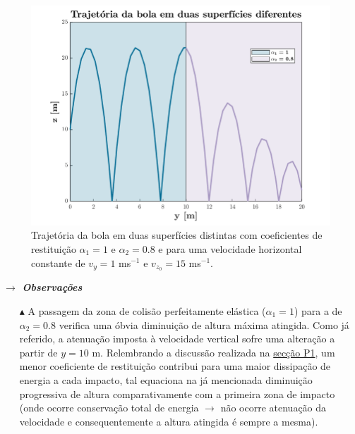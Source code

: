 \begin{figure}[H]
    \centering
    \includegraphics[width = 0.75\linewidth]{img/P3/P3-coefdif.png}
    \caption{Trajetória da bola em duas superfícies distintas com coeficientes de restituição $\alpha_1 = 1$ e $\alpha_2 = 0.8$ e para uma velocidade horizontal constante de $v_y = 1$ ms$^{-1}$ e $v_{z_0} = 15$ ms$^{-1}$.}
    \label{fig:2Pav}
\end{figure}

\noindent\textbf{\textit{$\rightarrow$ Observações}}
\vspace{-0.5em}
\begin{itemize}
    \item[$\blacktriangle$] A passagem da zona de colisão perfeitamente elástica ($\alpha_1 = 1$) para a de $\alpha_2 = 0.8$ verifica uma óbvia diminuição de altura máxima atingida. Como já referido, a atenuação imposta à velocidade vertical sofre uma alteração a partir de $y = 10$ m. Relembrando a discussão realizada na \hyperref[subsec:P1]{secção P1}, um menor coeficiente de restituição contribui para uma maior dissipação de energia a cada impacto, tal equaciona na já mencionada diminuição progressiva de altura comparativamente com a primeira zona de impacto (onde ocorre conservação total de energia $\rightarrow$ não ocorre atenuação da velocidade e consequentemente a altura atingida é sempre a mesma).
    
\end{itemize}
